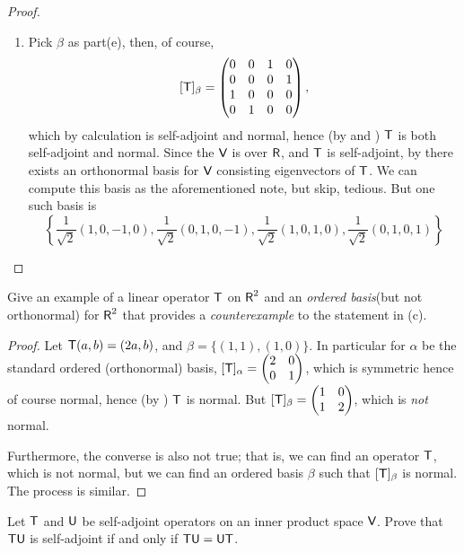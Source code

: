 \begin{proof}
\begin{enumerate}
\item Pick \(\beta\) as part(e), then, of course,
\[
    [\textsf{T}]_{\beta} = \begin{pmatrix}
        0 & 0 & 1 & 0 \\
        0 & 0 & 0 & 1 \\
        1 & 0 & 0 & 0 \\
        0 & 1 & 0 & 0
    \end{pmatrix},
\]
which by calculation is self-adjoint and normal, hence (by  and ) \(\textsf{T}\) is both self-adjoint and normal.
Since the \(\textsf{V}\) is over \(\textsf{R}\), and \(\textsf{T}\) is self-adjoint, by  there exists an orthonormal basis for \(\textsf{V}\) consisting eigenvectors of \(\textsf{T}\).
We can compute this basis as the aforementioned note, but skip, tedious.
But one such basis is
\[
    \left\{\frac{1}{\sqrt{2}}(1,0,-1,0), \frac{1}{\sqrt{2}}(0,1,0,-1), \frac{1}{\sqrt{2}}(1,0,1,0), \frac{1}{\sqrt{2}}(0,1,0,1)\right\}
\]
\end{enumerate}
\end{proof}

\begin{exercise} \label{exercise 6.4.3}
Give an example of a linear operator \(\textsf{T}\) on \(\textsf{R}^2\) and an \emph{ordered basis}(but not orthonormal) for \(\textsf{R}^2\) that provides a \emph{counterexample} to the statement in (c).
\end{exercise}

\begin{proof}
Let \(\textsf{T}(a, b) = (2a, b)\), and \(\beta = \{ (1, 1), (1, 0) \}\).
In particular for \(\alpha\) be the standard ordered (orthonormal) basis, \([\textsf{T}]_{\alpha} = \begin{pmatrix} 2 & 0 \\ 0 & 1 \end{pmatrix}\), which is symmetric hence of course normal, hence (by ) \(\textsf{T}\) is normal.
But \([\textsf{T}]_{\beta} = \begin{pmatrix} 1 & 0 \\ 1 & 2 \end{pmatrix}\), which is \emph{not} normal.

Furthermore, the converse is also not true;
that is, we can find an operator \(\textsf{T}\), which is not normal, but we can find an ordered basis \(\beta\) such that \([\textsf{T}]_{\beta}\) is normal.
The process is similar.
\end{proof}

\begin{exercise} \label{exercise 6.4.4}
Let \(\textsf{T}\) and \(\textsf{U}\) be self-adjoint operators on an inner product space \(\textsf{V}\).
Prove that \(\textsf{T}\textsf{U}\) is self-adjoint if and only if \(\textsf{T}\textsf{U} = \textsf{U}\textsf{T}\).
\end{exercise}

